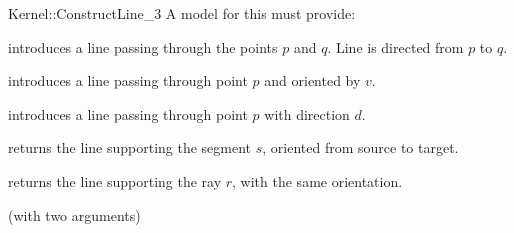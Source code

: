 \begin{ccRefFunctionObjectConcept}{Kernel::ConstructLine_3}
A model for this must provide:


            {introduces a line  passing through the points $p$ and $q$. 
             Line  is directed from $p$ to $q$.}

            {introduces a line  passing through point $p$ and
             oriented by $v$.}

            {introduces a line  passing through point $p$ with 
             direction $d$.}

            {returns the line supporting the segment $s$,
            oriented from source to target.}

            {returns the line supporting the ray $r$, with the
            same orientation.}

\ccRefines
{} (with two arguments)

\ccSeeAlso
{}  \\

\end{ccRefFunctionObjectConcept}
